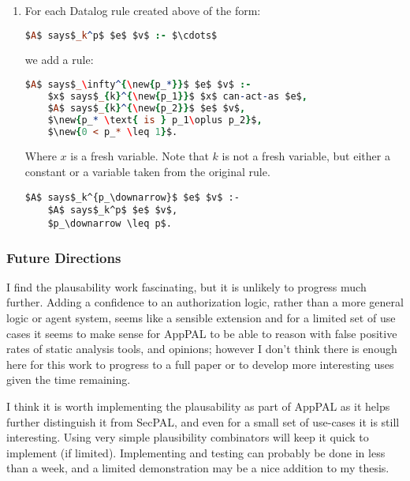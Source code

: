 \documentclass[a4paper]{scrartcl}
\begin{document}
\begin{enumerate}
  \item
    For each Datalog rule created above of the form:
    \begin{lstlisting}[language=Prolog]
      $A$ says$_k^p$ $e$ $v$ :- $\cdots$
    \end{lstlisting}
    we add a rule:

    \begin{lstlisting}[language=Prolog]
$A$ says$_\infty^{\new{p_*}}$ $e$ $v$ :-
    $x$ says$_{k}^{\new{p_1}}$ $x$ can-act-as $e$,
    $A$ says$_{k}^{\new{p_2}}$ $e$ $v$,
    $\new{p_* \text{ is } p_1\oplus p_2}$, 
    $\new{0 < p_* \leq 1}$.
    \end{lstlisting}
    Where $x$ is a fresh variable.  Note that $k$ is not a fresh variable, but either a constant or a variable taken from the original rule.
    

      
      \begin{lstlisting}[basicstyle=\color{BrickRed}\ttfamily]
$A$ says$_k^{p_\downarrow}$ $e$ $v$ :- 
    $A$ says$_k^p$ $e$ $v$,
    $p_\downarrow \leq p$.
      \end{lstlisting}
\end{enumerate}

\subsubsection*{Future Directions}

I find the plausability work fascinating, but it is unlikely to progress much
further.  Adding a confidence to an authorization logic, rather than a more
general logic or agent system, seems like a sensible extension and for a limited
set of use cases it seems to make sense for AppPAL to be able to reason with false
positive rates of static analysis tools, and opinions; however I don't think
there is enough here for this work to progress to a full paper or to develop
more interesting uses given the time remaining.

I think it is worth implementing the plausability as part of AppPAL as it helps
further distinguish it from SecPAL, and even for a small set of use-cases it is
still interesting.  Using very simple plausibility combinators will keep it
quick to implement (if limited).  Implementing and testing can probably be done
in less than a week, and a limited demonstration may be a nice addition to my thesis.
\end{document}
